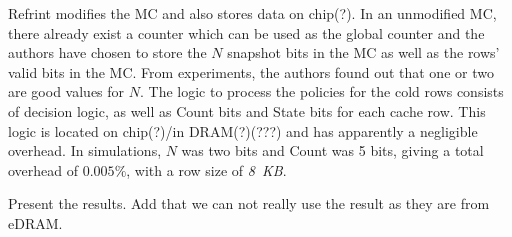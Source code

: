 
Refrint modifies the MC and also stores data on chip(?). In an unmodified MC, there already exist a counter which can be used as the global counter and the authors have chosen to store the $N$ snapshot bits in the MC as well as the rows' valid bits in the MC. From experiments, the authors found out that one or two are good values for $N$. The logic to process the policies for the cold rows consists of decision logic, as well as Count bits and State bits for each cache row. This logic is located on chip(?)/in DRAM(?)(???) and has apparently a negligible overhead. In simulations, $N$ was two bits and Count was 5 bits, giving a total overhead of $0.005\%$, with a row size of \textit{8~KB}.

Present the results. Add that we can not really use the result as they are from eDRAM.

